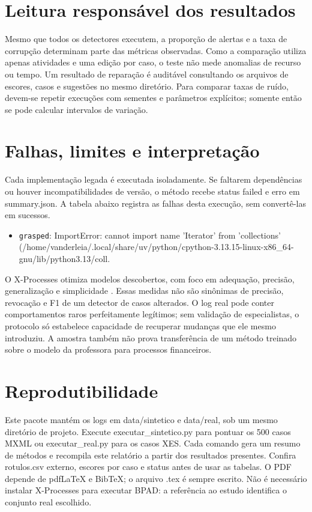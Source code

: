 \documentclass[conference]{IEEEtran}
\begin{document}
\section{Leitura responsável dos resultados}
Mesmo que todos os detectores executem, a proporção de alertas e a taxa de corrupção determinam parte das métricas observadas. Como a comparação utiliza apenas atividades e uma edição por caso, o teste não mede anomalias de recurso ou tempo. Um resultado de reparação é auditável consultando os arquivos de escores, casos e sugestões no mesmo diretório. Para comparar taxas de ruído, devem-se repetir execuções com sementes e parâmetros explícitos; somente então se pode calcular intervalos de variação.

\clearpage
\section{Falhas, limites e interpretação}
Cada implementação legada é executada isoladamente. Se faltarem dependências ou houver incompatibilidades de versão, o método recebe status failed e erro em summary.json. A tabela abaixo registra as falhas desta execução, sem convertê-las em sucessos.
\begin{itemize}
\item \texttt{grasped}: ImportError: cannot import name 'Iterator' from 'collections' (/home/vanderleia/.local/share/uv/python/cpython-3.13.15-linux-x86\_64-gnu/lib/python3.13/coll.
\end{itemize}

O X-Processes otimiza modelos descobertos, com foco em adequação, precisão, generalização e simplicidade \cite{fantinato2023xprocesses}. Essas medidas não são sinônimas de precisão, revocação e F1 de um detector de casos alterados. O log real pode conter comportamentos raros perfeitamente legítimos; sem validação de especialistas, o protocolo só estabelece capacidade de recuperar mudanças que ele mesmo introduziu. A amostra também não prova transferência de um método treinado sobre o modelo da professora para processos financeiros.

\section{Reprodutibilidade}
Este pacote mantém os logs em data/sintetico e data/real, sob um mesmo diretório de projeto. Execute executar\_sintetico.py para pontuar os 500 casos MXML ou executar\_real.py para os casos XES. Cada comando gera um resumo de métodos e recompila este relatório a partir dos resultados presentes. Confira rotulos.csv externo, escores por caso e status antes de usar as tabelas. O PDF depende de pdfLaTeX e BibTeX; o arquivo .tex é sempre escrito. Não é necessário instalar X-Processes para executar BPAD: a referência ao estudo identifica o conjunto real escolhido.
\end{document}
